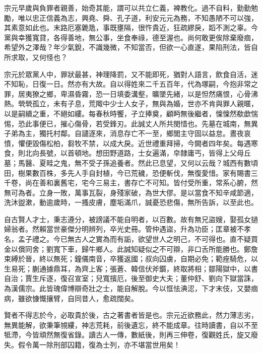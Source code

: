 \begin{pinyinscope}
 宗元早歲與負罪者親善，始奇其能，謂可以共立仁義，裨教化。過不自料，勤勤勉勵，唯以忠正信義為志，興堯、舜、孔子道，利安元元為務，不知愚陋不可以強，其素意如此也。末路厄塞臲卼，事既壅隔，很忤貴近，狂疏繆戾，蹈不測之辜。今黨與幸獲寬貸，各得善地，無公事，坐食奉祿，德至渥也。尚何敢更俟除棄廢痼，希望外之澤哉？年少氣銳，不識幾微，不知當否，但欲一心直遂，果陷刑法，皆自所求取，又何怪也？



 宗元於眾黨人中，罪狀最甚，神理降罰，又不能即死，猶對人語言，飲食自活，迷不知恥，日復一日。然亦有大故。自以得姓來二千五百年，代為塚嗣，今抱非常之罪，居夷獠之鄉，卑濕昏霧，恐一日填委溝壑，曠墜先緒，以是怛然痛恨，心骨沸熱。煢煢孤立，未有子息，荒陬中少士人女子，無與為婚，世亦不肯與罪人親暱，以是嗣續之重，不絕如縷。每春秋時饗，孑立捧奠，顧眄無後繼者，懍懍然欷歔惴惕，恐此事便已，摧心傷骨，若受鋒刃。此誠丈人所共閔惜也。先墓在城南，無異子弟為主，獨托村鄰。自譴逐來，消息存亡不一至，鄉閭主守固以益怠。晝夜哀憤，懼便毀傷松柏，芻牧不禁，以成大戾。近世禮重拜掃，今闕者四年矣。每遇寒食，則北向長號，以首頓地。想田野道路，士女遍滿，皁隸庸丐，皆得上父母丘墓；馬醫、夏畦之鬼，無不受子孫追養者。然此已息望，又何以云哉？城西有數頃田，樹果數百株，多先人手自封植，今已荒穢，恐便斬伐，無復愛惜。家有賜書三千卷，尚在善和裏舊宅，宅今三易主，書存亡不可知。皆付受所重，常系心腑，然無可為者。立身一敗，萬事瓦裂，身殘家破，為世大僇。是以當食不知辛咸節適，洗沐盥漱，動逾歲時，一搔皮膚，塵垢滿爪，誠憂恐悲傷，無所告訴，以至此也。



 自古賢人才士，秉志遵分，被謗議不能自明者，以百數。故有無兄盜嫂，娶孤女撾婦翁者。然賴當世豪傑分明辨列，卒光史冊。管仲遇盜，升為功臣；匡章被不孝名，孟子禮之。今已無古人之實為而有詬，欲望世人之明己，不可得也。直不疑買金以償同舍；劉寬下車，歸牛鄉人。此誠知疑似之不可辯，非口舌所能勝也。鄭詹束縛於晉，終以無死；鐘儀南音，卒獲返國；叔向囚虜，自期必免；範痤騎危，以生易死；蒯通據鼎耳，為齊上客；張蒼、韓信伏斧鑕，終取將相；鄒陽獄中，以書自治；賈生斥逐，復召宣室；兒寬擯厄，後至御史大夫；董仲舒、劉向下獄當誅，為漢儒宗。此皆瑰偉博辯奇壯之士，能自解脫。今以恇怯淟涊，下才末伎，又嬰痼病，雖欲慷慨攘臂，自同昔人，愈疏闊矣。



 賢者不得志於今，必取貴於後，古之著書者皆是也。宗元近欲務此，然力薄志劣，無異能解，欲秉筆覙縷，神志荒耗，前後遺忘，終不能成章。往時讀書，自以不至牴滯，今皆頑然無復省錄。讀古人一傳，數紙後，則再三伸卷，復觀姓氏，旋又廢失。假令萬一除刑部囚籍，復為士列，亦不堪當世用矣！




\end{pinyinscope}
